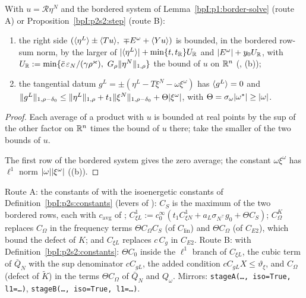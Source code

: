 \begin{lemma}\label{bpI:p2s2l1:border}
With $u=\mathcal R\eta^N$ and the bordered system of Lemma~\ref{bpI:p1:border-solve} (route A) or Proposition~\ref{bpI:p2s2:step} (route B):
\begin{enumerate}[label=(\alph*)]
\item the right side $(\langle \eta^L\rangle\pm\langle Tu\rangle,\ \mp E^\omega+\langle Yu\rangle)$ is bounded, in the bordered row-sum norm, by the larger of
  $\lvert \langle \eta^L\rangle\rvert+\min\{t,t_{\mathbb{R}}\}U_{\mathbb{R}}$ and $\lvert E^\omega\rvert+y_0U_{\mathbb{R}}$, with $U_{\R}:=\min\{\bar c\,\varepsilon_N/(\gamma\rho^\varkappa),\ G_\rho\norm{\eta^N}_{1,\rho}\}$ the bound of $u$ on $\mathbb{R}^n$
  (, (b));
\item the tangential datum $g^L=\pm(\eta^L-T\xi^N-\omega\xi^\omega)$ has $\langle g^L\rangle=0$ and
  $\lVert g^L\rVert_{1,\rho-\delta_0}\le\lVert \eta^L\rVert_{1,\rho}+t_1\lVert \xi^N\rVert_{1,\rho-\delta_0}+\Theta\lvert \xi^\omega\rvert$, with $\Theta=\sigma_\omega\lvert \omega^*\rvert\ge\lvert \omega\rvert$.
\end{enumerate}
\end{lemma}

\begin{proof}
\label{stepI:p2s2l1:av}
Each average of a product with $u$ is bounded at real points by the sup of the other factor on $\mathbb{R}^n$ times the bound of $u$ there; take the smaller of
the two bounds of $u$.

\label{stepI:p2s2l1:gl}
The first row of the bordered system gives the zero average; the constant $\omega\xi^\omega$ has $\ell^1$ norm $\lvert \omega\rvert\lvert \xi^\omega\rvert$
((b)).
\end{proof}

\begin{definition}\label{bpI:p2s2l1:constants}
Route A: the constants of  with the isoenergetic constants of Definition~\ref{bpI:p2s:constants} (levers of ):
$C_S$ is the maximum of the two bordered rows, each with $c_{\mathrm{avg}}$ of ; $C^1_{\xi L}:=c^\infty_0(t_1C^1_{\xi N}+a_L\sigma_{N^\top}g_0+\Theta C_S)$;
$C^K_\Omega$ replaces $C_\Omega$ in the frequency terms $\Theta C_\Omega C_S$ (of $C_{\mathrm{lin}}$) and $\Theta C_\Omega$ (of $C_{E2}$), which bound the defect of $K$; and $C_{\xi L}$ replaces
$c\,C_g$ in $C_{E2}$. Route B:  with Definition~\ref{bpI:p2s2:constants}: $\Theta C_0$ inside the $\ell^1$ branch of $C_{\xi L}$, the
cubic term of $\bar Q_N$ with the sup denominator $cC_{gL}$, the added condition $cC_{gL}X\le\vartheta_\xi$, and $C_\Omega$ (defect of $\tilde K$) in the
terms $\Theta C_\Omega$ of $\bar Q_N$ and $Q_\omega$. Mirrors: \texttt{stageA(\dots, iso=True, l1=\dots)}, \texttt{stageB(\dots, iso=True, l1=\dots)}.
\end{definition}

